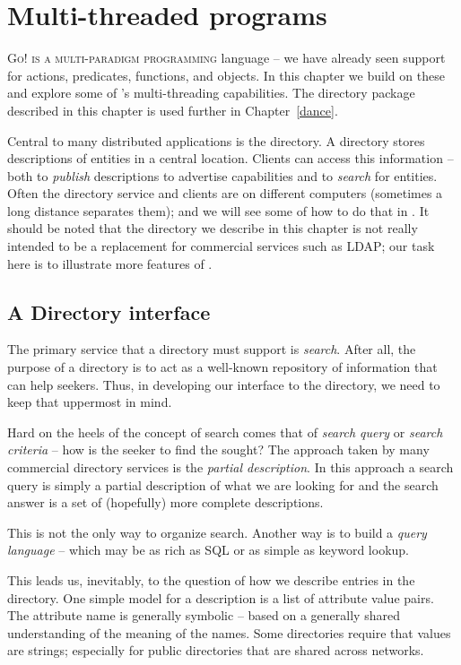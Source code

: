 \chapter{Multi-threaded programs}
\label{directory}
\lettrine{G}{o! is a multi-paradigm programming} language -- we have already seen support for actions, predicates, functions, and objects. In this chapter we build on these and explore some of \go's multi-threading capabilities. The directory package described in this chapter is used further in Chapter~\ref{dance}.

Central to many distributed applications is the directory.
A directory stores descriptions of entities in a central location. Clients can access this information -- both to \emph{publish} descriptions to advertise capabilities and to \emph{search} for entities. Often the directory service and clients are on different computers (sometimes a long distance separates them); and we will see some of how to do that in \go. It should be noted that the directory we describe in this chapter is not really intended to be a replacement for commercial services such as LDAP; our task here is to illustrate more features of \go.

\section{A Directory interface}
\label{directory:interface}

The primary service that a directory must support is \emph{search}. After all, the purpose of a directory is to act as a well-known repository of information that can help seekers. Thus, in developing our interface to the directory, we need to keep that uppermost in mind.

Hard on the heels of the concept of search comes that of \emph{search query} or \emph{search criteria} -- how is the seeker to find the sought? The approach taken by many commercial directory services is the \emph{partial description}. In this approach a search query is simply a partial description of what we are looking for and the search answer is a set of (hopefully) more complete descriptions.
\begin{aside}
This is not the only way to organize search. Another way is to build a \emph{query language} -- which may be as rich as SQL or as simple as keyword lookup.
\end{aside}

This leads us, inevitably, to the question of how we describe entries in the directory. One simple model for a description is a list of attribute value pairs. The attribute name is generally symbolic -- based on a generally shared understanding of the meaning of the names. Some directories require that values are strings; especially for public directories that are shared across networks.

